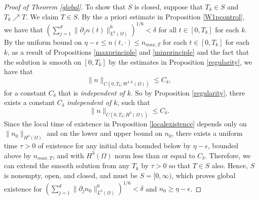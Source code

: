 \documentclass[12pt]{article}
\theoremstyle{plain}
\begin{document}
\begin{proof}[Proof of Theorem \ref{global}]
To show that $S$ is closed, suppose that $T_{k} \in S$ and $T_{k} \nearrow T$. We claim $T \in S$. By the a priori estimate in Proposition \ref{W1pcontrol}, we have that $\left(\sum_{j = 1}^{d} \|\partial_{j}n(t)\|_{L^{6}(\Omega)}^{6}\right)^{1/6} < \delta$ for all $t \in [0, T_{k}]$ for each $k$. By the uniform bound on $\eta - \epsilon \le n(t, \cdot) \le n_{max, T}$ for each $t \in [0, T_{k}]$ for each $k$, as a result of Propositions \ref{maxprinciple} and \ref{minprinciple} and the fact that the solution is smooth on $[0, T_{k}]$ by the estimates in Proposition \ref{regularity}, we have that
\begin{equation*}
\|n\|_{C(0, T_{k}; W^{1, 6}(\Omega))} \le C_{\delta},
\end{equation*}
for a constant $C_{\delta}$ that is \textit{independent of $k$}. So by Proposition \ref{regularity}, there exists a constant $C_{\delta}$ \textit{independent of $k$}, such that
\begin{equation*}
\|n\|_{C(0, T_{k}; H^{3}(\Omega))} \le C_{\delta}.
\end{equation*}
Since the local time of existence in Proposition \ref{localexistence} depends only on $\|n_{0}\|_{H^{3}(\Omega)}$ and on the lower and upper bound on $n_{0}$, there exists a uniform time $\tau > 0$ of existence for any initial data bounded below by $\eta - \epsilon$, bounded above by $n_{max, T}$, and with $H^{3}(\Omega)$ norm less than or equal to $C_{\delta}$. Therefore, we can extend the smooth solution from any $T_{k}$ by $\tau > 0$ so that $T \in S$ also. Hence, $S$ is nonempty, open, and closed, and must be $S = [0, \infty)$, which proves global existence for $\left(\sum_{j = 1}^{d} \|\partial_{j} n_{0}\|^{6}_{L^{6}(\Omega)}\right)^{1/6} < \delta$ and $n_{0} \ge \eta - \epsilon$.


\end{proof}
\end{document}
